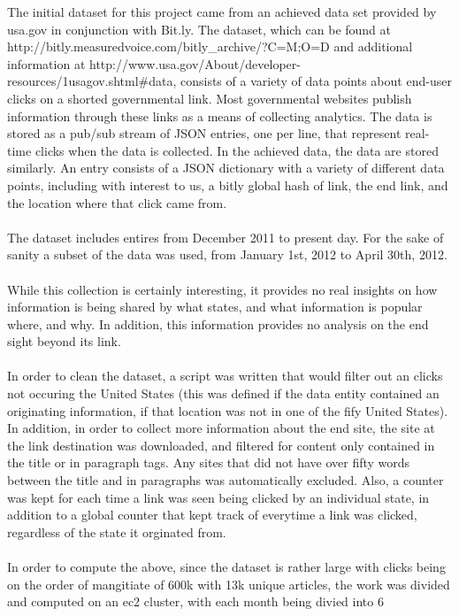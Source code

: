 \documentclass[11pt]{article}
\begin{document}
The initial dataset for this project came from an achieved data set provided by
usa.gov in conjunction with Bit.ly.  The dataset, which can be found at 
http://bitly.measuredvoice.com/bitly_archive/?C=M;O=D and additional 
information at http://www.usa.gov/About/developer-resources/1usagov.shtml#data,
consists of a variety of data points about end-user clicks on a shorted 
governmental link.  Most governmental websites publish information through 
these links as a means of collecting analytics. The data is stored as a pub/sub
stream of JSON entries, one per line, that represent real-time clicks when the 
data is collected.  In the achieved data, the data are stored similarly.  
An entry consists of a JSON dictionary with a variety of different data points, 
including with interest to us, a bitly global hash of link, the end link, and 
the location where that click came from.\\ 
\\
The dataset includes entires from December 2011 to present day.  For the sake 
of sanity a subset of the data was used, from January 1st, 2012 to April 30th, 
2012.\\ 
\\
While this collection is certainly interesting, it provides no real insights on 
how information is being shared by what states, and what information is popular 
where, and why.  In addition, this information provides no analysis on the end 
sight beyond its link.\\
\\
In order to clean the dataset, a script was written that would filter out an 
clicks not occuring the United States (this was defined if the data entity 
contained an originating information, if that location was not in one of the 
fify United States).  In addition, in order to collect more information about 
the end site, the site at the link destination was downloaded, and filtered for
content only contained in the title or in paragraph tags.  Any sites that 
did not have over fifty words between the title and in paragraphs was 
automatically excluded.  Also, a counter was kept for each time a link was seen being 
clicked by an individual state, in addition to a global counter that kept track 
of everytime a link was clicked, regardless of the state it orginated from.\\ 
\\
In order to compute the above, since the dataset is rather large with clicks 
being on the order of mangitiate of 600k with 13k unique articles, the work
was divided and computed on an ec2 cluster, with each month being divied into 6
\end{document}
